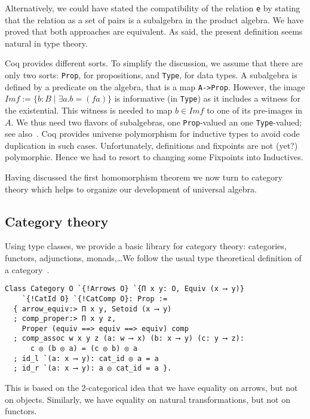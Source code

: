 \documentclass[a4paper,10pt,runningheads]{llncs}
\begin{document}
Alternatively, we could have stated the compatibility of the relation \lstinline|e| by stating that the
relation as a set of pairs is a subalgebra in the product algebra. We have proved that both approaches
are equivalent. As said, the present definition seems natural in type theory. 

Coq provides different sorts. To simplify the discussion, we assume that there are only two sorts:
\lstinline|Prop|, for propositions, and \lstinline|Type|, for data types. A subalgebra is defined by a predicate on the algebra, that is a map \lstinline|A->Prop|. However, the image $Im f:=\{b:B \mid \exists a. b=(f a)\}$ is informative (in \lstinline|Type|) as it includes a witness for the existential. This witness is needed to map $b\in Im f$ to one of its pre-images in $A$. We thus need two flavors of subalgebras, one \lstinline|Prop|-valued an one \lstinline|Type|-valued; see also~\cite{coquand-towards}. Coq provides universe polymorphism for inductive types to avoid code duplication in such cases. Unfortunately, definitions and fixpoints are not (yet?) polymorphic. Hence we had to resort to changing some Fixpoints into Inductives.

Having discussed the first homomorphism theorem we now turn to category theory which helps to organize our development of universal algebra. 

\subsection{Category theory}\label{cats}
Using type classes, we provide a basic library for category theory: categories, functors,
adjunctions, monads,\ldots We follow the usual type theoretical definition of a
category~\cite{saibi1995constructive}.


\begin{lstlisting}
Class Category O `{!Arrows O} `{Π x y: O, Equiv (x ⟶ y)}
    `{!CatId O} `{!CatComp O}: Prop :=
  { arrow_equiv:> Π x y, Setoid (x ⟶ y)
  ; comp_proper:> Π x y z,
    Proper (equiv ==> equiv ==> equiv) comp
  ; comp_assoc w x y z (a: w ⟶ x) (b: x ⟶ y) (c: y ⟶ z):
      c ◎ (b ◎ a) = (c ◎ b) ◎ a
  ; id_l `(a: x ⟶ y): cat_id ◎ a = a
  ; id_r `(a: x ⟶ y): a ◎ cat_id = a }.
\end{lstlisting}

This is based on the 2-categorical idea that we have equality on arrows, but not on objects.
Similarly, we have equality on natural transformations, but not on functors.
\end{document}
